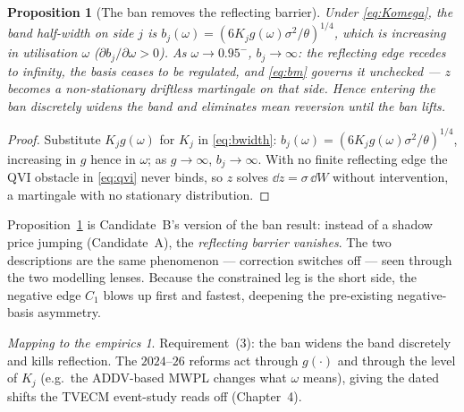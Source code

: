 \documentclass[11pt,a4paper]{article}
\theoremstyle{plain}
\newtheorem{proposition}{Proposition}
\theoremstyle{definition}
\theoremstyle{remark}
\newtheorem*{takeaway}{Mapping to the empirics}
\begin{document}
\begin{proposition}[The ban removes the reflecting barrier]\label{prop:ban}
Under \eqref{eq:Komega}, the band half-width on side $j$ is $b_j(\omega)=(6K_j g(\omega)\sigma^2/\theta)^{1/4}$, which is increasing in utilisation $\omega$ ($\partial b_j/\partial\omega>0$). As $\omega\to0.95^{-}$, $b_j\to\infty$: the reflecting edge recedes to infinity, the basis ceases to be regulated, and \eqref{eq:bm} governs it unchecked --- $z$ becomes a non-stationary driftless martingale on that side. Hence entering the ban discretely widens the band and eliminates mean reversion until the ban lifts.
\end{proposition}
\begin{proof}
Substitute $K_j g(\omega)$ for $K_j$ in \eqref{eq:bwidth}: $b_j(\omega)=(6K_jg(\omega)\sigma^2/\theta)^{1/4}$, increasing in $g$ hence in $\omega$; as $g\to\infty$, $b_j\to\infty$. With no finite reflecting edge the QVI obstacle in \eqref{eq:qvi} never binds, so $z$ solves $\dd z=\sigma\,\dd W$ without intervention, a martingale with no stationary distribution.
\end{proof}

Proposition~\ref{prop:ban} is Candidate~B's version of the ban result: instead of a shadow price jumping (Candidate~A), the \emph{reflecting barrier vanishes}. The two descriptions are the same phenomenon --- correction switches off --- seen through the two modelling lenses. Because the constrained leg is the short side, the negative edge $C_1$ blows up first and fastest, deepening the pre-existing negative-basis asymmetry.

\begin{takeaway}
Requirement~(3): the ban widens the band discretely and kills reflection. The $2024$--$26$ reforms act through $g(\cdot)$ and through the level of $K_j$ (e.g.\ the ADDV-based MWPL changes what $\omega$ means), giving the dated shifts the TVECM event-study reads off (Chapter~4).
\end{takeaway}
\end{document}
